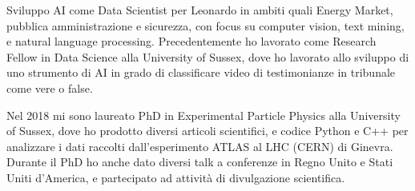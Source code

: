 
Sviluppo AI come Data Scientist per Leonardo in ambiti quali Energy Market, pubblica amministrazione e sicurezza, con focus su computer vision, text mining, e natural language processing. Precedentemente ho lavorato come Research Fellow in Data Science alla University of Sussex, dove ho lavorato allo sviluppo di uno strumento di AI in grado di classificare video di testimonianze in tribunale come vere o false. 

Nel 2018 mi sono laureato PhD in Experimental Particle Physics alla University of Sussex, dove ho prodotto diversi articoli scientifici, e codice Python e C++ per analizzare i dati raccolti dall'esperimento ATLAS al LHC (CERN) di Ginevra. Durante il PhD ho anche dato diversi talk a conferenze in Regno Unito e Stati Uniti d'America, e partecipato ad attività di divulgazione scientifica. 
